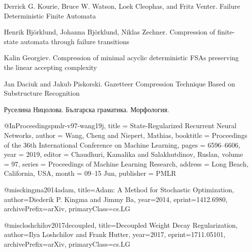 \documentclass[a4paper,12pt]{article}
\begin{document}
\begin{thebibliography}{}

\newblock Derrick G. Kourie, Bruce W. Watson, Loek Cleophas, and Fritz Venter.
\newblock Failure Deterministic Finite Automata

\newblock Henrik Björklund, Johanna Björklund, Niklas Zechner.
\newblock Compression of finite-state automata through failure transitions

\newblock Kalin Georgiev.
\newblock Compression of minimal acyclic deterministic FSAs preserving the linear accepting complexity

\newblock Jan Daciuk and Jakub Piskorski.
\newblock Gazetteer Compression Technique Based on Substructure Recognition

\newblock Руселина Ницолова.
\newblock Българска граматика. Морфология.

@InProceedings{pmlr-v97-wang19j,  
          title = 	 {State-Regularized Recurrent Neural Networks},  
          author = 	 {Wang, Cheng and Niepert, Mathias},  
          booktitle = 	 {Proceedings of the 36th International Conference on Machine Learning},  
          pages = 	 {6596--6606},  
          year = 	 {2019},  
          editor = 	 {Chaudhuri, Kamalika and Salakhutdinov, Ruslan},  
          volume = 	 {97},  
          series = 	 {Proceedings of Machine Learning Research},  
          address = 	 {Long Beach, California, USA},  
          month = 	 {09--15 Jun},  
          publisher = 	 {PMLR}  
        }

@misc{kingma2014adam,
    title={Adam: A Method for Stochastic Optimization},
    author={Diederik P. Kingma and Jimmy Ba},
    year={2014},
    eprint={1412.6980},
    archivePrefix={arXiv},
    primaryClass={cs.LG}
}

@misc{loshchilov2017decoupled,
    title={Decoupled Weight Decay Regularization},
    author={Ilya Loshchilov and Frank Hutter},
    year={2017},
    eprint={1711.05101},
    archivePrefix={arXiv},
    primaryClass={cs.LG}
}

\end{thebibliography}

\pagebreak
\end{document}
